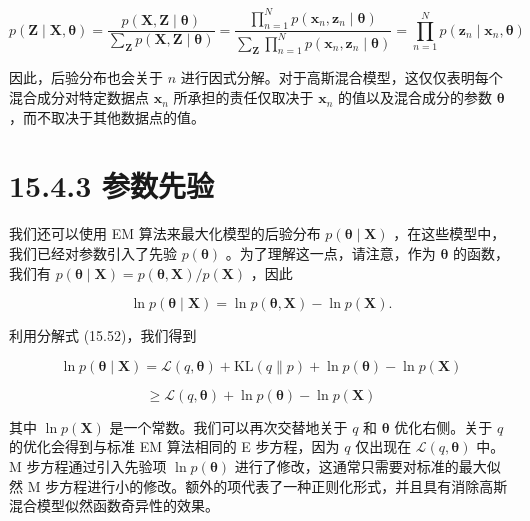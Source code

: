 \documentclass[10pt]{article}
\begin{document}
\[
p\left( {\mathbf{Z} \mid  \mathbf{X},\mathbf{\theta }}\right)  = \frac{p\left( {\mathbf{X},\mathbf{Z} \mid  \mathbf{\theta }}\right) }{\mathop{\sum }\limits_{\mathbf{Z}}p\left( {\mathbf{X},\mathbf{Z} \mid  \mathbf{\theta }}\right) } = \frac{\mathop{\prod }\limits_{{n = 1}}^{N}p\left( {{\mathbf{x}}_{n},{\mathbf{z}}_{n} \mid  \mathbf{\theta }}\right) }{\mathop{\sum }\limits_{\mathbf{Z}}\mathop{\prod }\limits_{{n = 1}}^{N}p\left( {{\mathbf{x}}_{n},{\mathbf{z}}_{n} \mid  \mathbf{\theta }}\right) } = \mathop{\prod }\limits_{{n = 1}}^{N}p\left( {{\mathbf{z}}_{n} \mid  {\mathbf{x}}_{n},\mathbf{\theta }}\right)  \tag{15.57}
\]

因此，后验分布也会关于 \(n\) 进行因式分解。对于高斯混合模型，这仅仅表明每个混合成分对特定数据点 \({\mathbf{x}}_{n}\) 所承担的责任仅取决于 \({\mathbf{x}}_{n}\) 的值以及混合成分的参数 \(\mathbf{\theta }\) ，而不取决于其他数据点的值。

\section*{15.4.3 参数先验}

我们还可以使用 EM 算法来最大化模型的后验分布 \(p\left( {\mathbf{\theta } \mid  \mathbf{X}}\right)\) ，在这些模型中，我们已经对参数引入了先验 \(p\left( \mathbf{\theta }\right)\) 。为了理解这一点，请注意，作为 \(\mathbf{\theta }\) 的函数，我们有 \(p\left( {\mathbf{\theta } \mid  \mathbf{X}}\right)  = p\left( {\mathbf{\theta },\mathbf{X}}\right) /p\left( \mathbf{X}\right)\) ，因此

\[
\ln p\left( {\mathbf{\theta } \mid  \mathbf{X}}\right)  = \ln p\left( {\mathbf{\theta },\mathbf{X}}\right)  - \ln p\left( \mathbf{X}\right) . \tag{15.58}
\]

利用分解式 (15.52)，我们得到

\[
\ln p\left( {\mathbf{\theta } \mid  \mathbf{X}}\right)  = \mathcal{L}\left( {q,\mathbf{\theta }}\right)  + \mathrm{{KL}}\left( {q\parallel p}\right)  + \ln p\left( \mathbf{\theta }\right)  - \ln p\left( \mathbf{X}\right)
\]

\[
\geq  \mathcal{L}\left( {q,\mathbf{\theta }}\right)  + \ln p\left( \mathbf{\theta }\right)  - \ln p\left( \mathbf{X}\right)  \tag{15.59}
\]

其中 \(\ln p\left( \mathbf{X}\right)\) 是一个常数。我们可以再次交替地关于 \(q\) 和 \(\mathbf{\theta }\) 优化右侧。关于 \(q\) 的优化会得到与标准 EM 算法相同的 E 步方程，因为 \(q\) 仅出现在 \(\mathcal{L}\left( {q,\mathbf{\theta }}\right)\) 中。M 步方程通过引入先验项 \(\ln p\left( \mathbf{\theta }\right)\) 进行了修改，这通常只需要对标准的最大似然 M 步方程进行小的修改。额外的项代表了一种正则化形式，并且具有消除高斯混合模型似然函数奇异性的效果。
\end{document}
